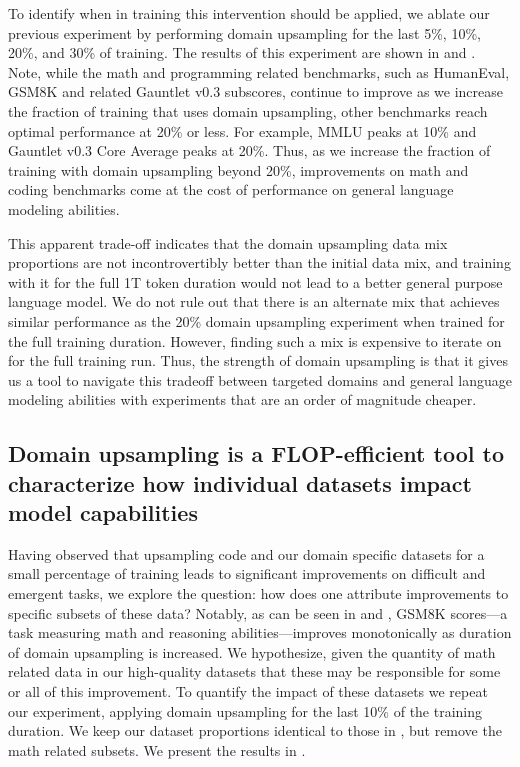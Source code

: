 \documentclass[10pt]{article} %
\begin{document}
To identify when in training this intervention should be applied, we ablate our previous experiment by performing domain upsampling for the last 5\%, 10\%, 20\%, and 30\% of training. 
The results of this experiment are shown in  and .
Note, while the math and programming related benchmarks, such as HumanEval, GSM8K and related Gauntlet v0.3 subscores, continue to improve as we increase the fraction of training that uses domain upsampling, other benchmarks reach optimal performance at 20\% or less.
For example, MMLU peaks at 10\% and Gauntlet v0.3 Core Average peaks at 20\%.
Thus, as we increase the fraction of training with domain upsampling beyond 20\%, improvements on math and coding benchmarks come at the cost of performance on general language modeling abilities.


This apparent trade-off indicates that the domain upsampling data mix proportions are not incontrovertibly better than the initial data mix, and training with it for the full 1T token duration would not lead to a better general purpose language model.
We do not rule out that there is an alternate mix that achieves similar performance as the 20\% domain upsampling experiment when trained for the full training duration.
However, finding such a mix is expensive to iterate on for the full training run. 
Thus, the strength of domain upsampling is that it gives us a tool to navigate this tradeoff between targeted domains and general language modeling abilities with experiments that are an order of magnitude cheaper.


\subsection{Domain upsampling is a FLOP-efficient tool to characterize how individual datasets impact model capabilities}
\label{sec:sans-math}


Having observed that upsampling code and our domain specific datasets for a small percentage of training leads to significant improvements on difficult and emergent tasks, we explore the question: how does one attribute improvements to specific subsets of these data? Notably, as can be seen in  and , GSM8K scores---a task measuring math and reasoning abilities---improves monotonically as duration of domain upsampling is increased. We hypothesize, given the quantity of math related data in our high-quality datasets that these may be responsible for some or all of this improvement. To quantify the impact of these datasets we repeat our experiment, applying domain upsampling for the last 10\% of the training duration. We keep our dataset proportions identical to those in , but remove the math related subsets. We present the results in .
\end{document}
